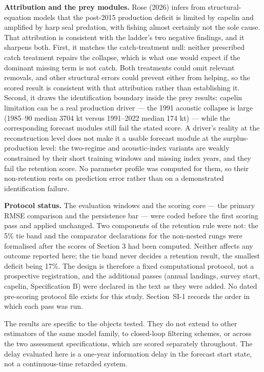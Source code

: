 \documentclass[11pt]{article}
\begin{document}
\textbf{Attribution and the prey modules.} Rose (2026) infers from
structural-equation models that the post-2015 production deficit is
limited by capelin and amplified by harp seal predation, with fishing
almost certainly not the sole cause. That attribution is consistent with
the ladder's two negative findings, and it sharpens both. First, it
matches the catch-treatment null: neither prescribed catch treatment
repairs the collapse, which is what one would expect if the dominant
missing term is not catch. Both treatments could omit relevant
removals, and other structural errors could prevent either from helping,
so the scored result is consistent with that attribution rather than
establishing it. Second, it draws the
identification boundary inside the prey results: capelin limitation can
be a real production driver --- the 1991 acoustic collapse is large
(1985--90 median 3704 kt versus 1991--2022 median 174 kt) --- while the
corresponding forecast modules still fail the stated score. A driver's
reality at the reconstruction level does not make it a usable forecast
module at the surplus-production level: the two-regime and
acoustic-index variants are weakly constrained by their short training
windows and missing index years, and they fail the retention score. No
parameter profile was computed for them, so their non-retention rests
on prediction error rather than on a demonstrated identification
failure.

\textbf{Protocol status.} The evaluation windows and the scoring core
--- the primary RMSE comparison and the persistence bar --- were coded
before the first scoring pass and applied unchanged. Two components of
the retention rule were not: the 5\% tie band and the comparator
declarations for the non-nested rungs were formalised after the scores
of Section 3 had been computed. Neither affects any outcome reported
here; the tie band never decides a retention result, the smallest
deficit being 17\%. The design is therefore a fixed computational
protocol, not a prospective registration, and the additional passes
(annual landings, survey start, capelin, Specification B) were declared
in the text as they were added. No dated pre-scoring protocol file exists for this study.
Section~SI-1 records the order in which each pass was run.

The results are specific to the objects tested. They do not extend to
other estimators of the same model family, to closed-loop filtering
schemes, or across the two assessment specifications, which are scored
separately throughout. The delay evaluated here is a one-year
information delay in the forecast start state, not a continuous-time
retarded system.
\end{document}
